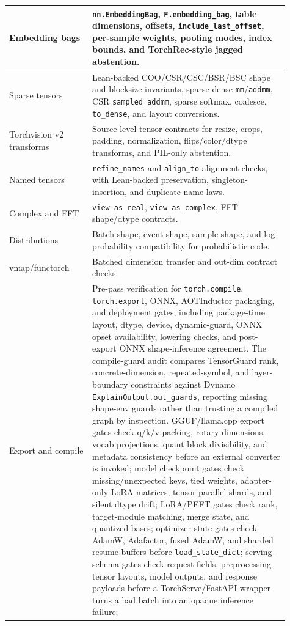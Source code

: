 \documentclass[11pt]{article}
\newcommand{\tg}{TensorGuard}
\begin{document}
\begin{longtable}{|p{0.27\linewidth}|p{0.64\linewidth}|}
\hline
Embedding bags &
\texttt{nn.EmbeddingBag}, \texttt{F.embedding\_bag}, table dimensions, offsets,
\texttt{include\_last\_offset}, per-sample weights, pooling modes, index
bounds, and TorchRec-style jagged abstention. \\
\hline
Sparse tensors &
Lean-backed COO/CSR/CSC/BSR/BSC shape and blocksize invariants, sparse-dense
\texttt{mm}/\texttt{addmm}, CSR \texttt{sampled\_addmm}, sparse softmax,
coalesce, \texttt{to\_dense}, and layout conversions. \\
\hline
Torchvision v2 transforms &
Source-level tensor contracts for resize, crops, padding, normalization,
flips/color/dtype transforms, and PIL-only abstention. \\
\hline
Named tensors &
\texttt{refine\_names} and \texttt{align\_to} alignment checks, with
Lean-backed preservation, singleton-insertion, and duplicate-name laws. \\
\hline
Complex and FFT &
\texttt{view\_as\_real}, \texttt{view\_as\_complex}, FFT shape/dtype contracts. \\
\hline
Distributions &
Batch shape, event shape, sample shape, and log-probability compatibility for
probabilistic code. \\
\hline
vmap/functorch &
Batched dimension transfer and out-dim contract checks. \\
\hline
Export and compile &
Pre-pass verification for \texttt{torch.compile}, \texttt{torch.export}, ONNX,
AOTInductor packaging, and deployment gates, including package-time layout,
dtype, device, dynamic-guard, ONNX opset availability, lowering checks, and
post-export ONNX shape-inference agreement.  The compile-guard audit compares
\tg{} rank, concrete-dimension, repeated-symbol, and layer-boundary constraints
against Dynamo \texttt{ExplainOutput.out\_guards}, reporting missing shape-env
guards rather than trusting a compiled graph by inspection.  GGUF/llama.cpp export gates check
q/k/v packing, rotary dimensions, vocab projections, quant block divisibility,
and metadata consistency before an external converter is invoked; model
checkpoint gates check missing/unexpected keys, tied weights, adapter-only LoRA
matrices, tensor-parallel shards, and silent dtype drift; LoRA/PEFT gates check
rank, target-module matching, merge state, and quantized bases; optimizer-state gates check
AdamW, Adafactor, fused AdamW, and sharded resume buffers before
\texttt{load\_state\_dict}; serving-schema gates check request fields,
preprocessing tensor layouts, model outputs, and response payloads before a
TorchServe/FastAPI wrapper turns a bad batch into an opaque inference failure;

\end{longtable}
\end{document}
